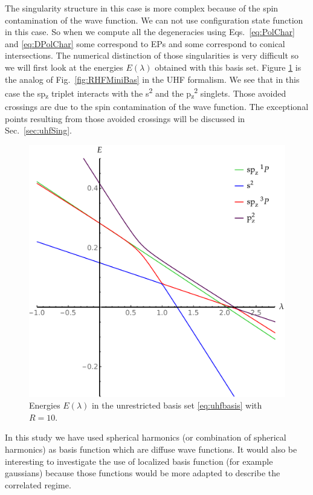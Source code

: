 \documentclass[11pt,a4paper]{article}
\begin{document}
The singularity structure in this case is more complex because of the spin contamination of the wave function. We can not use configuration state function in this case. So when we compute all the degeneracies using Eqs.~\eqref{eq:PolChar} and \eqref{eq:DPolChar} some correspond to EPs and some correspond to conical intersections. The numerical distinction of those singularities is very difficult so we will first look at the energies $E(\lambda)$ obtained with this basis set.
Figure \ref{fig:UHFMiniBas} is the analog of Fig.~\ref{fig:RHFMiniBas} in the UHF formalism. We see that in this case the sp\textsubscript{z} triplet interacts with the s\textsuperscript{2} and the p\textsubscript{z}\textsuperscript{2} singlets. Those avoided crossings are due to the spin contamination of the wave function. The exceptional points resulting from those avoided crossings will be discussed in Sec.~\ref{sec:uhfSing}. \\

\begin{figure}
    \centering
    \includegraphics[width=\linewidth]{EMP_UHF_R10.pdf}
    \caption{Energies $E(\lambda)$ in the unrestricted basis set \eqref{eq:uhfbasis} with $R=10$.}
    \label{fig:UHFMiniBas}
\end{figure}

In this study we have used spherical harmonics (or combination of spherical harmonics) as basis function which are diffuse wave functions. It would also be interesting to investigate the use of localized basis function \cite{Seidl_2018} (for example gaussians) because those functions would be more adapted to describe the correlated regime. \\
\end{document}
